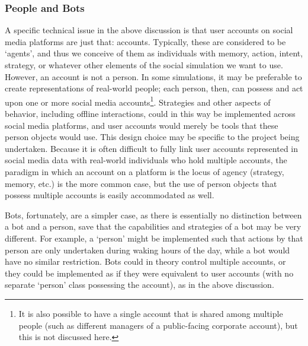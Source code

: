 \subsubsection{People and Bots}
A specific technical issue in the above discussion is that user accounts on social media platforms are just that: accounts. 
Typically, these are considered to be `agents', and thus we conceive of them as individuals with memory, action, intent, strategy, or whatever other elements of the social simulation we want to use. However, an account is not a person. In some simulations, it may be preferable to create representations of real-world people; each person, then, can possess and act upon one or more social media accounts\footnote{It is also possible to have a single account that is shared among multiple people (such as different managers of a public-facing corporate account), but this is not discussed here.}. Strategies and other aspects of behavior, including offline interactions, could in this way be implemented across social media platforms, and user accounts would merely be tools that these person objects would use. This design choice may be specific to the project being undertaken. Because it is often difficult to fully link user accounts represented in social media data with real-world individuals who hold multiple accounts, the paradigm in which an account on a platform is the locus of agency (strategy, memory, etc.) is the more common case, but the use of person objects that possess multiple accounts is easily accommodated as well.

Bots, fortunately, are a simpler case, as there is essentially no distinction between a bot and a person, save that the capabilities and strategies of a bot may be very different. For example, a `person' might be implemented such that actions by that person are only undertaken during waking hours of the day, while a bot would have no similar restriction. Bots could in theory control multiple accounts, or they could be implemented as if they were equivalent to user accounts (with no separate `person' class possessing the account), as in the above discussion.
